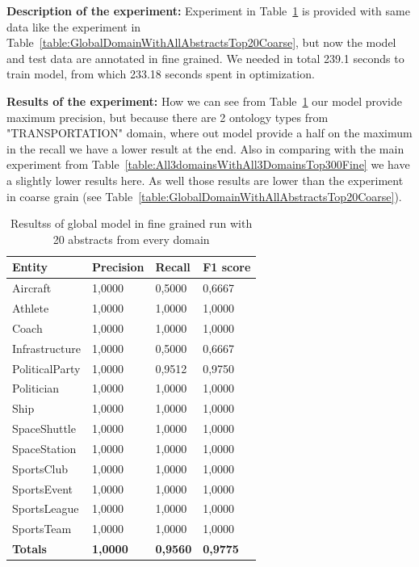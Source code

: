 \documentclass[thesis=M,english]{FITthesis}[2018/05/30]
\begin{document}
\textbf{Description of the experiment:} Experiment in Table~\ref{table:GlobalDomainWithAllAbstractsTop20Fine} is provided with same data like the experiment in Table~\ref{table:GlobalDomainWithAllAbstractsTop20Coarse}, but now the model and test data are annotated in fine grained. We needed in total 239.1 seconds to train model, from which 233.18 seconds spent in optimization.

\textbf{Results of the experiment:} How we can see from Table~\ref{table:GlobalDomainWithAllAbstractsTop20Fine} our model provide maximum precision, but because there are 2 ontology types from "TRANSPORTATION" domain, where out model provide a half on the maximum in the recall we have a lower result at the end. Also in comparing with the main experiment from Table~\ref{table:All3domainsWithAll3DomainsTop300Fine} we have a slightly lower results here. As well those results are lower than the experiment in coarse grain (see Table~\ref{table:GlobalDomainWithAllAbstractsTop20Coarse}).

	\begin{table}[H]\centering
		\begin{tabular}{|l|l|l|l|}
			\hline {\textbf{Entity}} & {\textbf{Precision}} & {\textbf{Recall}} & {\textbf{F1 score}}\\\hline
				Aircraft & 1,0000 & 0,5000 & 0,6667\\
				Athlete & 1,0000 & 1,0000 & 1,0000\\
				Coach & 1,0000 & 1,0000 & 1,0000\\
				Infrastructure & 1,0000 & 0,5000 & 0,6667\\
				PoliticalParty & 1,0000 & 0,9512 & 0,9750\\
				Politician & 1,0000 & 1,0000 & 1,0000\\
				Ship & 1,0000 & 1,0000 & 1,0000\\
				SpaceShuttle & 1,0000 & 1,0000 & 1,0000\\
				SpaceStation & 1,0000 & 1,0000 & 1,0000\\ 
				SportsClub & 1,0000 & 1,0000 & 1,0000\\
				SportsEvent & 1,0000 & 1,0000 & 1,0000\\
				SportsLeague & 1,0000 & 1,0000 & 1,0000\\
				SportsTeam & 1,0000 & 1,0000 & 1,0000\\\hline
				\textbf{Totals} & \textbf{1,0000} & \textbf{0,9560} & \textbf{0,9775}\\\hline
		\end{tabular}
		\caption{Resultss of global model in fine grained run with 20 abstracts from every domain \label{table:GlobalDomainWithAllAbstractsTop20Fine}}
	\end{table}
\end{document}
